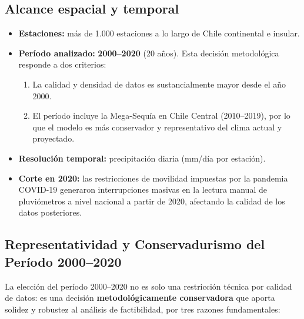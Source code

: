 \documentclass[12pt, a4paper]{article}
\begin{document}
\subsection{Alcance espacial y temporal}

\begin{itemize}
    \item \textbf{Estaciones:} más de 1.000 estaciones a lo largo de Chile continental e insular.
    \item \textbf{Período analizado:} \textbf{2000--2020} (20 años). Esta decisión metodológica responde a dos criterios:
    \begin{enumerate}
        \item La calidad y densidad de datos es sustancialmente mayor desde el año 2000.
        \item El período incluye la Mega-Sequía en Chile Central (2010--2019), por lo que el modelo es más conservador y representativo del clima actual y proyectado.
    \end{enumerate}
    \item \textbf{Resolución temporal:} precipitación diaria (mm/día por estación).
    \item \textbf{Corte en 2020:} las restricciones de movilidad impuestas por la pandemia COVID-19 generaron interrupciones masivas en la lectura manual de pluviómetros a nivel nacional a partir de 2020, afectando la calidad de los datos posteriores.
\end{itemize}

\subsection{Representatividad y Conservadurismo del Período 2000--2020}
\label{sec:representatividad}

La elección del período 2000--2020 no es solo una restricción técnica por calidad de datos: es una decisión \textbf{metodológicamente conservadora} que aporta solidez y robustez al análisis de factibilidad, por tres razones fundamentales:
\end{document}
